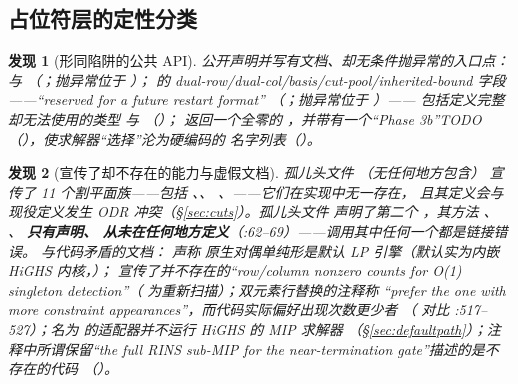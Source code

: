 \documentclass[11pt]{ctexart}
\newtheorem{finding}{发现}
\begin{document}
\subsection{占位符层的定性分类}

\begin{finding}[形同陷阱的公共 API]
\label{find:trap-api}
公开声明并写有文档、却无条件抛异常的入口点：
 与 
（；抛异常位于 ）；
 的 dual-row/dual-col/basis/cut-pool/inherited-bound
字段——“reserved for a future restart format”
（；抛异常位于 ）——
包括定义完整却无法使用的类型  与
（）；
 返回一个全零的
，并带有一个“Phase 3b”TODO
（），使求解器“选择”沦为硬编码的
名字列表（）。
\end{finding}

\begin{finding}[宣传了却不存在的能力与虚假文档]
\label{find:false-docs}
孤儿头文件 （无任何地方包含）
宣传了 11 个割平面族——包括 、、
、——\emph{它们在实现中无一存在}，
且其定义会与现役定义发生 ODR
冲突（\S\ref{sec:cuts}）。孤儿头文件
 声明了第二个
，其方法 、
、 \textbf{只有声明、
从未在任何地方定义}（:62--69）——调用其中任何一个都是链接错误。
与代码矛盾的文档： 声称
原生对偶单纯形是默认 LP 引擎（默认实为内嵌
HiGHS 内核，）；
宣传了并不存在的“row/column nonzero
counts for O(1) singleton detection”（
为重新扫描）；双元素行替换的注释称
“prefer the one with more constraint
appearances”，而代码实际偏好出现次数更少者
（ 对比 :517--527）；名为
 的适配器并不运行 HiGHS 的 MIP 求解器
（\S\ref{sec:defaultpath}）；注释中所谓保留“the full RINS sub-MIP
for the near-termination gate”描述的是不存在的代码
（）。
\end{finding}
\end{document}
